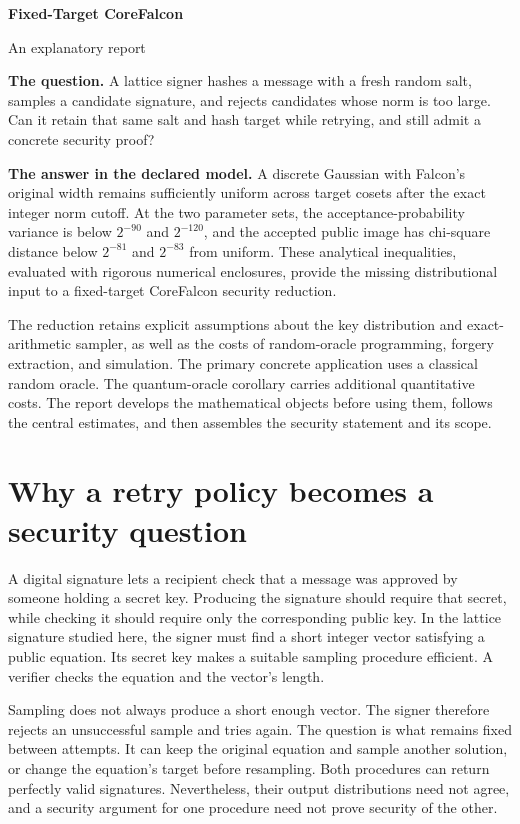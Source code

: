 \documentclass[11pt,a4paper]{article}
\theoremstyle{definition}
\theoremstyle{remark}
\numberwithin{equation}{section}
\begin{document}
{\LARGE\bfseries\color{ink}Fixed-Target CoreFalcon\par}
\vspace{4pt}
{\large An explanatory report\par}
\vspace{11pt}
\textbf{The question.} A lattice signer hashes a message with a fresh random salt, samples a candidate signature, and rejects candidates whose norm is too large. Can it retain that same salt and hash target while retrying, and still admit a concrete security proof?

\textbf{The answer in the declared model.} A discrete Gaussian with Falcon's original width remains sufficiently uniform across target cosets after the exact integer norm cutoff. At the two parameter sets, the acceptance-probability variance is below $2^{-90}$ and $2^{-120}$, and the accepted public image has chi-square distance below $2^{-81}$ and $2^{-83}$ from uniform. These analytical inequalities, evaluated with rigorous numerical enclosures, provide the missing distributional input to a fixed-target CoreFalcon security reduction.

The reduction retains explicit assumptions about the key distribution and exact-arithmetic sampler, as well as the costs of random-oracle programming, forgery extraction, and simulation. The primary concrete application uses a classical random oracle. The quantum-oracle corollary carries additional quantitative costs. The report develops the mathematical objects before using them, follows the central estimates, and then assembles the security statement and its scope.

\vspace{4pt}
\tableofcontents
\clearpage


\section{Why a retry policy becomes a security question}
\label{sec:retry-question}

A digital signature lets a recipient check that a message was approved by
someone holding a secret key. Producing the signature should require that
secret, while checking it should require only the corresponding public key.
In the lattice signature studied here, the signer must find a short integer
vector satisfying a public equation. Its secret key makes a suitable sampling
procedure efficient. A verifier checks the equation and the vector's length.

Sampling does not always produce a short enough vector. The signer therefore
rejects an unsuccessful sample and tries again. The question is what remains
fixed between attempts. It can keep the original equation and sample another
solution, or change the equation's target before resampling. Both procedures
can return perfectly valid signatures. Nevertheless, their output distributions
need not agree, and a security argument for one procedure need not prove
security of the other.
\end{document}
